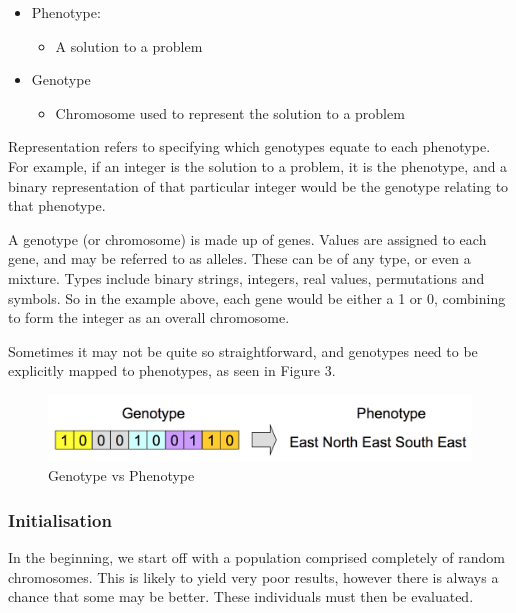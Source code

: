 \documentclass[12pt,a4paper]{article}
\begin{document}

\begin{itemize}
	\item Phenotype:
	\begin{itemize}
		\item A solution to a problem
	\end{itemize}
	
	\item Genotype 
	\begin{itemize}
		\item Chromosome used to represent the solution to a problem
	\end{itemize}
\end{itemize}

Representation refers to specifying which genotypes equate to each phenotype\citep{IntroductionToEvolutionaryComputing}. For example, if an integer is the solution to a problem, it is the phenotype, and a binary representation of that particular integer would be the genotype relating to that phenotype. 

A genotype (or chromosome) is made up of genes. Values are assigned to each gene, and may be referred to as alleles. These can be of any type, or even a mixture. Types include binary strings, integers, real values, permutations and symbols. So in the example above, each gene would be either a 1 or 0, combining to form the integer as an overall chromosome.

Sometimes it may not be quite so straightforward, and genotypes need to be explicitly mapped to phenotypes, as seen in Figure 3. 

\begin{figure}[h]
	\centering
	\includegraphics[width = \textwidth]{GenoToPheno.png}
	\caption{Genotype vs Phenotype}
\end{figure}


\subsubsection{Initialisation}
In the beginning, we start off with a population comprised completely of random chromosomes. This is likely to yield very poor results, however there is always a chance that some may be better. These individuals must then be evaluated.
\end{document}
